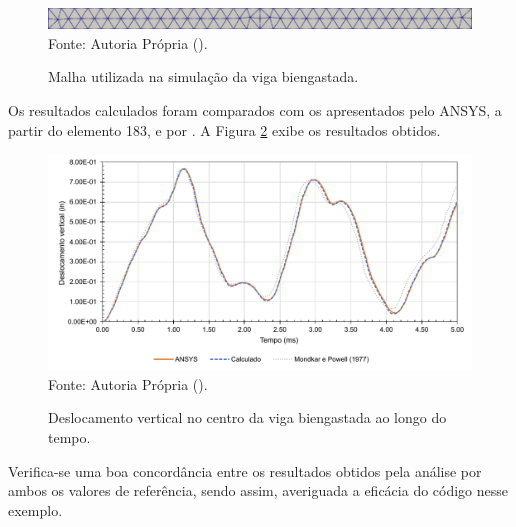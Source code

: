 \begin{figure}[h!]
    \centering
    \caption{Malha utilizada na simulação da viga biengastada.}
    \includegraphics[width=\linewidth]{Figuras/vigas/mesh2.png}
    \\Fonte: Autoria Própria (\the\year).
    \label{fig:viga2-mesh}
\end{figure}

Os resultados calculados foram comparados com os apresentados pelo ANSYS, a partir do elemento 183, e por \cite{mondkar1977ansa}. A Figura \ref{fig:res-viga2} exibe os resultados obtidos.

\begin{figure}[h!]
    \centering
    \caption{Deslocamento vertical no centro da viga biengastada ao longo do tempo.}
    \includegraphics[width=\linewidth]{Figuras/vigas/res2.pdf}
    \\Fonte: Autoria Própria (\the\year).
    \label{fig:res-viga2}
\end{figure}

Verifica-se uma boa concordância entre os resultados obtidos pela análise por ambos os valores de referência, sendo assim, averiguada a eficácia do código nesse exemplo.